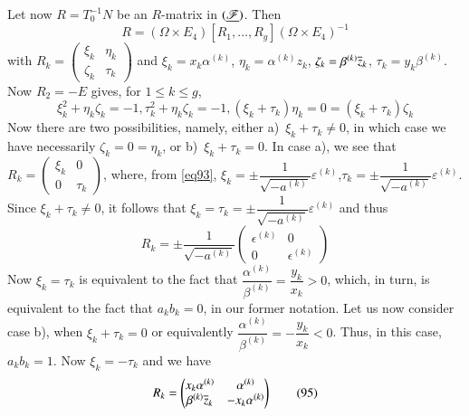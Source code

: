 Let now $R=T^{-1}_{0}N$ be an $R$-matrix in $(\underline{\mathscr{F}})$. Then
\begin{equation*}
R=(\Omega\times E_{4})[R_{1},\ldots,R_{g}](\Omega\times
E_{4})^{-1}\tag{92}\label{eq92} 
\end{equation*}
with $R_{k}=\left(\begin{smallmatrix} \xi_{k} & \eta_{k}\\ \zeta_{k} &
  \tau_{k}
\end{smallmatrix}\right)$ and $\xi_{k}=x_{k}\alpha^{(k)}$,
$\eta_{k}=\alpha^{(k)}z_{k}$, $\zeta_{k}=\beta^{(k)}\overline{z}_{k}$,
$\tau_{k}=y_{k}\beta^{(k)}$. Now $R_{2}=-E$ gives, for $1\leq k\leq
g$,
\begin{equation*}
\xi^{2}_{k}+\eta_{k}\zeta_{k}=-1,\tau^{2}_{k}+\eta_{k}\zeta_{k}=-1,(\xi_{k}+\tau_{k})\eta_{k}=0=(\xi_{k}+\tau_{k})\zeta_{k}\tag{93}\label{eq93} 
\end{equation*}
Now there are two possibilities, namely, either
a)~$\xi_{k}+\tau_{k}\neq 0$, in which case we have necessarily
$\zeta_{k}=0=\eta_{k}$, or b)~$\xi_{k}+\tau_{k}=0$. In case a), we see
that $R_{k}=\left(\begin{smallmatrix} \xi_{k} & 0\\ 0 & \tau_{k}
\end{smallmatrix}\right)$, where, from \eqref{eq93}, $\xi_{k}=\pm
\dfrac{1}{\sqrt{-a^{(k)}}}\varepsilon^{(k)}$,\pageoriginale $\tau_{k}=\pm
\dfrac{1}{\sqrt{-a^{(k)}}}\varepsilon^{(k)}$. Since $\xi_{k}+\tau_{k}\neq
0$, it follows that $\xi_{k}=\tau_{k}=\pm
\dfrac{1}{\sqrt{-a^{(k)}}}\varepsilon^{(k)}$ and thus 
\begin{equation*}
R_{k}=\pm \frac{1}{\sqrt{-a^{(k)}}}
\begin{pmatrix}
\epsilon^{(k)} & 0\\
0 & \epsilon^{(k)}
\end{pmatrix}\tag{94}\label{eq94}
\end{equation*}
Now $\xi_{k}=\tau_{k}$ is equivalent to the fact that
$\dfrac{\alpha^{(k)}}{\beta^{(k)}}=\dfrac{y_{k}}{x_{k}}>0$, which, in
turn, is equivalent to the fact that $a_{k}b_{k}=0$, in our former
notation. Let us now consider case b), when $\xi_{k}+\tau_{k}=0$ or
equivalently
$\dfrac{\alpha^{(k)}}{\beta^{(k)}}=-\dfrac{y_{k}}{x_{k}}<0$. Thus, in
this case, $a_{k}b_{k}=1$. Now $\xi_{k}=-\tau_{k}$ and we have
\begin{equation*}
R_{k}=
\begin{pmatrix}
x_{k}\alpha^{(k)} & \alpha^{(k)}\\
\beta^{(k)}\overline{z}_{k} & -x_{k}\alpha^{(k)}
\end{pmatrix}\tag{95}\label{eq95}
\end{equation*}
